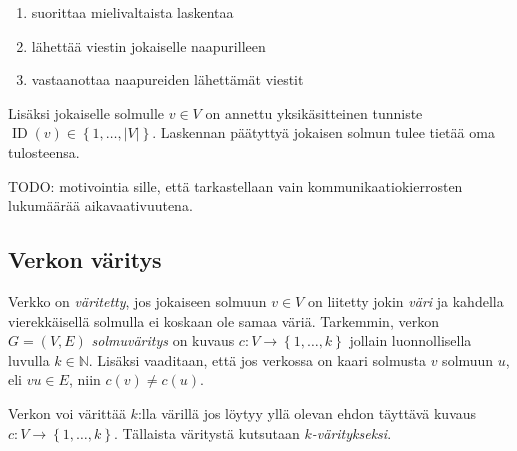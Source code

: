 \documentclass[finnish]{tktltiki2}
\theoremstyle{definition}
\theoremstyle{remark}
\newcommand{\set}[1]{\left\{ #1 \right\}}
\newcommand{\nat}{\mathbb{N}}
\DeclareMathOperator{\id}{ID}
\begin{document}
\begin{enumerate}
    \item suorittaa mielivaltaista laskentaa
    \item lähettää viestin jokaiselle naapurilleen
    \item vastaanottaa naapureiden lähettämät viestit
\end{enumerate}

Lisäksi jokaiselle solmulle $v \in V$ on annettu yksikäsitteinen tunniste
$\id(v) \in \set{1,\dots,|V|}$. Laskennan päätyttyä jokaisen solmun tulee
tietää oma tulosteensa.

TODO: motivointia sille, että tarkastellaan vain kommunikaatiokierrosten
lukumäärää aikavaativuutena.

\subsection{Verkon väritys}

Verkko on \emph{väritetty}, jos jokaiseen solmuun $v \in V$ on liitetty jokin
\emph{väri} ja kahdella vierekkäisellä solmulla ei koskaan ole samaa väriä.
Tarkemmin, verkon $G = (V,E)$ \emph{solmuväritys} on kuvaus $c : V \rightarrow
\set{1,\dots,k}$ jollain luonnollisella luvulla $k \in \nat$. Lisäksi
vaaditaan, että jos verkossa on kaari solmusta $v$ solmuun $u$, eli $vu \in E$,
niin $c(v) \neq c(u)$.

Verkon voi värittää $k$:lla värillä jos löytyy yllä olevan ehdon täyttävä
kuvaus $c : V \rightarrow \set{1,\dots,k}$. Tällaista väritystä kutsutaan
\emph{$k$-väritykseksi}.


\begin{center}
\end{center}
\end{document}
